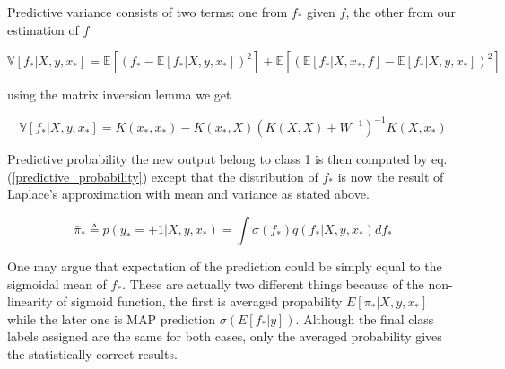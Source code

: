 \documentclass[14pt]{report}
\numberwithin{equation}{chapter}
\begin{document}
\begin{spacing}{2}
Predictive variance consists of two terms: one from $f_\ast$ given $f$, the other from our estimation of $f$

\begin{equation}
\label{predictive_var_classification}
\mathbb{V}[f_\ast|X,y,x_\ast] = \mathbb{E}[(f_\ast - \mathbb{E}[f_\ast|X,y,x_\ast])^2] + \mathbb{E}[(\mathbb{E}[f_\ast|X,x_\ast,f] - \mathbb{E}[f_\ast|X,y,x_\ast])^2]
\end{equation}

using the matrix inversion lemma\cite{woodbury1950inverting} we get

\begin{equation}
\mathbb{V}[f_\ast|X,y,x_\ast] = K(x_\ast,x_\ast) - K(x_\ast,X)(K(X,X) + W^{-1})^{-1}K(X,x_\ast)
\end{equation}

Predictive probability the new output belong to class 1 is then computed by eq. (\ref{predictive_probability}) except that the distribution of $f_\ast$ is now the result of Laplace's approximation with mean and variance as stated above. 

\begin{equation}
\bar{\pi}_* \triangleq p(y_* = +1|X,y,x_*) = \int \sigma (f_*)q(f_*|X,y,x_*) df_*
\end{equation}

One may argue that expectation of the prediction could be simply equal to the sigmoidal mean of $f_*$. These are actually two different things because of the non-linearity of sigmoid function, the first is averaged propability $E[\pi_*|X,y,x_*]$ while the later one is MAP prediction $\sigma (E[f_*|y])$. Although the final class labels assigned are the same for both cases, only the averaged probability gives the statistically correct results. 

\begin{figure}


\end{figure}
\end{spacing}
\end{document}

